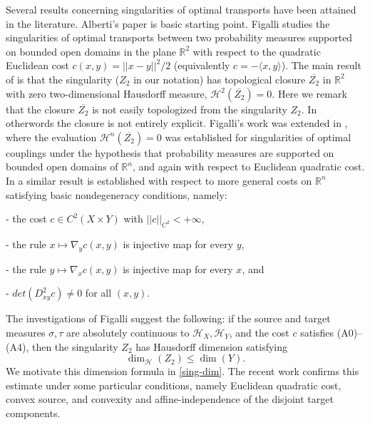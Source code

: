 \documentclass[12pt]{amsart}
\theoremstyle{definition}
\theoremstyle{remark}
\newcommand{\bR}{\mathbb{R}}
\begin{document}
Several results concerning singularities of optimal transports have been attained in the literature. Alberti's paper \cite{Alberti} is basic starting point. Figalli \cite{Fig} studies the singularities of optimal transports between two probability measures supported on bounded open domains in the plane $\bR^2$ with respect to the quadratic Euclidean cost $c(x,y)=||x-y||^2/2$ (equivalently $c=-\langle x,y\rangle$). The main result of \cite[\S 3.2]{Fig} is that the singularity ($Z_2$ in our notation) has topological closure $\overline{Z_2}$ in $\bR^2$ with zero two-dimensional Hausdorff measure, $\mathscr{H}^2(\overline{Z_2})=0.$ Here we remark that the closure $\overline{Z_2}$ is not easily topologized from the singularity $Z_2$. In otherwords the closure is not entirely explicit. Figalli's work was extended in \cite{Fig-Kim}, where the evaluation $\mathscr{H}^n(\overline{Z_2})=0$ was established for singularities of optimal couplings under the hypothesis that probability measures are supported on bounded open domains of $\bR^n$, and again with respect to Euclidean quadratic cost. In \cite{Fig-dP} a similar result is established with respect to more general costs on $\bR^n$ satisfying basic nondegeneracy conditions, namely: 

- the cost $c\in C^2(X\times Y)$ with $||c||_{C^2} <+\infty$, 

- the rule $x\mapsto \nabla_y c(x,y)$ is injective map for every $y$, 

- the rule $y\mapsto \nabla_x c(x,y)$ is injective map for every $x$, and 

- $det(D_{xy}^2 c) \neq 0$ for all $(x,y)$. 

The investigations of Figalli suggest the following: if the source and target measures $\sigma, \tau$ are absolutely continuous to $\mathscr{H}_X, \mathscr{H}_Y$, and the cost $c$ satisfies (A0)--(A4), then the singularity $Z_2$ has Hausdorff dimension satisfying $$\dim_{\mathscr{H}} (Z_2)\leq \dim(Y).$$ We motivate this dimension formula in \ref{sing-dim}. The recent work \cite{KitMc} confirms this estimate under some particular conditions, namely Euclidean quadratic cost, convex source, and convexity and affine-independence of the disjoint target components. %
\end{document}
